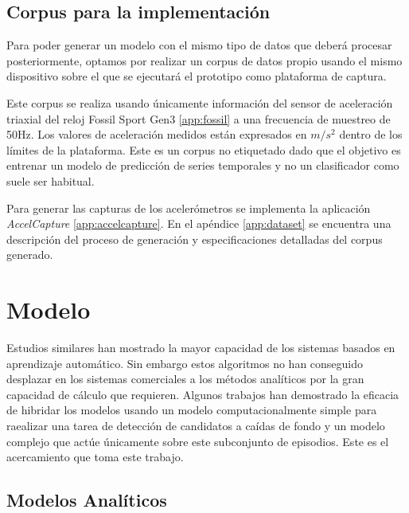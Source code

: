 \documentclass[../tfm.tex]{subfiles}
\begin{document}
\subsection{Corpus para la implementación}

Para poder generar un modelo con el mismo tipo de datos que deberá procesar posteriormente, optamos por realizar un corpus de datos propio usando el mismo dispositivo sobre el que se ejecutará el prototipo como plataforma de captura.

Este corpus se realiza usando únicamente información del sensor de aceleración triaxial del reloj Fossil Sport Gen3 \ref{app:fossil} a una frecuencia de muestreo de 50Hz. Los valores de aceleración medidos están expresados en $m/s^2$ dentro de los límites de la plataforma. Este es un corpus no etiquetado dado que el objetivo es entrenar un modelo de predicción de series temporales y no un clasificador como suele ser habitual.

Para generar las capturas de los acelerómetros se implementa la aplicación \textit{AccelCapture} \ref{app:accelcapture}. En el apéndice \ref{app:dataset} se encuentra una descripción del proceso de generación y especificaciones detalladas del corpus generado.

\section{Modelo}

Estudios similares han mostrado la mayor capacidad de los sistemas basados en aprendizaje automático. Sin embargo estos algoritmos no han conseguido desplazar en los sistemas comerciales a los métodos analíticos por la gran capacidad de cálculo que requieren. Algunos trabajos han demostrado la eficacia de hibridar los modelos usando un modelo computacionalmente simple para raealizar una tarea de detección de candidatos a caídas de fondo y un modelo complejo que actúe únicamente sobre este subconjunto de episodios. Este es el acercamiento que toma este trabajo.

\subsection{Modelos Analíticos}
\end{document}
